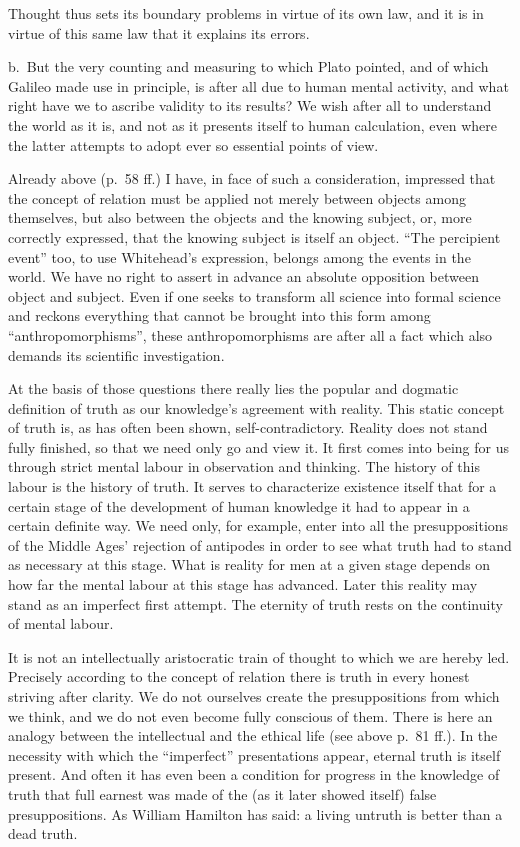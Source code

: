 \documentclass[12pt]{article}
\newcommand{\opage}[1]{\marginnote{\footnotesize\textit{[#1]}}}
\begin{document}
Thought thus sets its boundary problems in virtue of its own law, and it is
in virtue of this same law that it explains its errors.

b.~But the very counting and measuring to which Plato pointed, and of which
Galileo made use in principle, is after all due to human mental activity,
and what right have we to ascribe validity to its results? We wish after all
to understand the world as it is, and not as it presents itself to human
calculation, even where the latter attempts to adopt ever so essential
points of view.

Already above (p.~58 ff.) I have, in face of such a consideration,
impressed that the concept of relation must be applied not merely between
objects among themselves, but also between the objects and the knowing
subject, or, more correctly expressed, \opage{104}that the knowing subject is itself an
object. ``The percipient event'' too, to use Whitehead's expression, belongs
among the events in the world. We have no right to assert in advance an
absolute opposition between object and subject. Even if one seeks to
transform all science into formal science and reckons everything that cannot
be brought into this form among ``anthropomorphisms'', these anthropomorphisms
are after all a fact which also demands its scientific investigation.

At the basis of those questions there really lies the popular and dogmatic
definition of truth as our knowledge's agreement with reality. This static
concept of truth is, as has often been shown, self-contradictory. Reality
does not stand fully finished, so that we need only go and view it. It first
comes into being for us through strict mental labour in observation and
thinking. The history of this labour is the history of truth. It serves to
characterize existence itself that for a certain stage of the development of
human knowledge it had to appear in a certain definite way. We need only,
for example, enter into all the presuppositions of the Middle Ages'
rejection of antipodes in order to see what truth had to stand as necessary
at this stage. What is reality for men at a given stage depends on how far
the mental labour at this stage has advanced. Later this reality may stand
as an imperfect first attempt. The eternity of truth rests on the continuity
of mental labour.

It is not an intellectually aristocratic train of thought to which we are
hereby led. Precisely according to the concept of relation there is truth in
every honest striving after clarity. We do not ourselves create the
presuppositions from which we think, and we \opage{105}do not even become fully
conscious of them. There is here an analogy between the intellectual and the
ethical life (see above p.~81 ff.). In the necessity with which the
``imperfect'' presentations appear, eternal truth is itself present. And
often it has even been a condition for progress in the knowledge of truth
that full earnest was made of the (as it later showed itself) false
presuppositions. As William Hamilton has said: a living untruth is better
than a dead truth.
\end{document}
